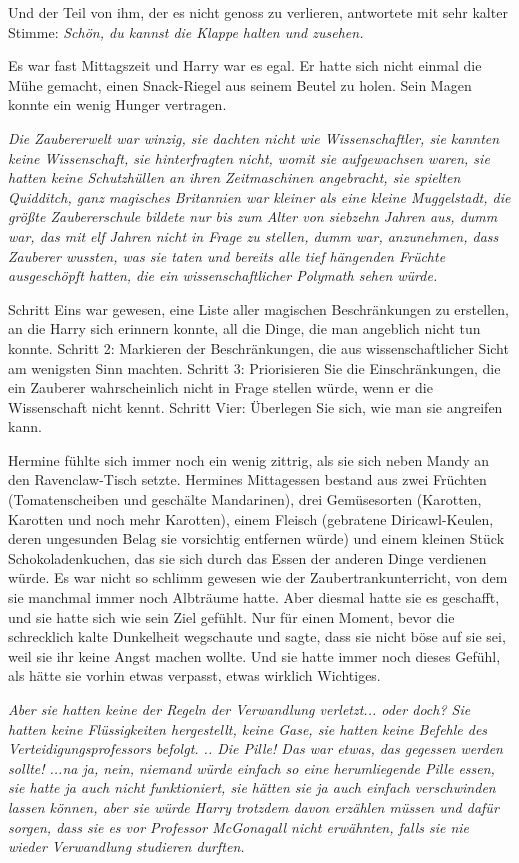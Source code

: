 Und der Teil von ihm, der es nicht genoss zu verlieren, antwortete mit sehr
kalter Stimme: \emph{Schön, du kannst die Klappe halten und zusehen.}

Es war fast Mittagszeit und Harry war es egal. Er hatte sich nicht einmal die
Mühe gemacht, einen Snack-Riegel aus seinem Beutel zu holen. Sein Magen konnte
ein wenig Hunger vertragen.

\emph{Die Zaubererwelt war winzig, sie dachten nicht wie Wissenschaftler, sie
kannten keine Wissenschaft, sie hinterfragten nicht, womit sie aufgewachsen
waren, sie hatten keine Schutzhüllen an ihren Zeitmaschinen angebracht, sie
spielten Quidditch, ganz magisches Britannien war kleiner als eine kleine
Muggelstadt, die größte Zaubererschule bildete nur bis zum Alter von siebzehn
Jahren aus, dumm war, das mit elf Jahren nicht in Frage zu stellen, dumm war,
anzunehmen, dass Zauberer wussten, was sie taten und bereits alle tief
hängenden Früchte ausgeschöpft hatten, die ein wissenschaftlicher Polymath
sehen würde.}

Schritt Eins war gewesen, eine Liste aller magischen Beschränkungen zu
erstellen, an die Harry sich erinnern konnte, all die Dinge, die man angeblich
nicht tun konnte. Schritt 2: Markieren der Beschränkungen, die aus
wissenschaftlicher Sicht am wenigsten Sinn machten. Schritt 3: Priorisieren Sie
die Einschränkungen, die ein Zauberer wahrscheinlich nicht in Frage stellen
würde, wenn er die Wissenschaft nicht kennt. Schritt Vier: Überlegen Sie sich,
wie man sie angreifen kann.

Hermine fühlte sich immer noch ein wenig zittrig, als sie sich neben Mandy an
den Ravenclaw-Tisch setzte. Hermines Mittagessen bestand aus zwei Früchten
(Tomatenscheiben und geschälte Mandarinen), drei Gemüsesorten (Karotten,
Karotten und noch mehr Karotten), einem Fleisch (gebratene Diricawl-Keulen,
deren ungesunden Belag sie vorsichtig entfernen würde) und einem kleinen Stück
Schokoladenkuchen, das sie sich durch das Essen der anderen Dinge verdienen
würde. Es war nicht so schlimm gewesen wie der Zaubertrankunterricht, von dem
sie manchmal immer noch Albträume hatte. Aber diesmal hatte sie es geschafft,
und sie hatte sich wie sein Ziel gefühlt. Nur für einen Moment, bevor die
schrecklich kalte Dunkelheit wegschaute und sagte, dass sie nicht böse auf sie
sei, weil sie ihr keine Angst machen wollte. Und sie hatte immer noch dieses
Gefühl, als hätte sie vorhin etwas verpasst, etwas wirklich Wichtiges.

\emph{Aber sie hatten keine der Regeln der Verwandlung verletzt... oder doch?
Sie hatten keine Flüssigkeiten hergestellt, keine Gase, sie hatten keine Befehle
des Verteidigungsprofessors befolgt. .. Die Pille! Das war etwas, das gegessen
werden sollte! ...na ja, nein, niemand würde einfach so eine herumliegende Pille
essen, sie hatte ja auch nicht funktioniert, sie hätten sie ja auch einfach
verschwinden lassen können, aber sie würde Harry trotzdem davon erzählen müssen
und dafür sorgen, dass sie es vor Professor McGonagall nicht erwähnten, falls
sie nie wieder Verwandlung studieren durften.}

